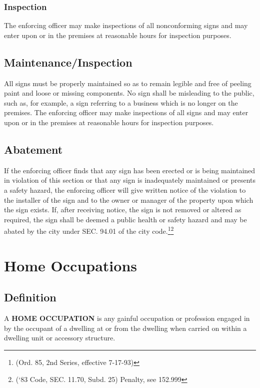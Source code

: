 \subsubsection{Inspection}
The enforcing officer may make inspections of all nonconforming signs and may enter upon or in the premises at reasonable hours for inspection purposes.
\subsection{Maintenance/Inspection}
All signs must be properly maintained so as to remain legible and free of peeling paint and loose or missing components. No sign shall be misleading to the public, such as, for example, a sign referring to a business which is no longer on the premises. The enforcing officer may make inspections of all signs and may enter upon or in the premises at reasonable hours for inspection purposes.
\subsection{Abatement}
If the enforcing officer finds that any sign has been erected or is being maintained in violation of this section or that any sign is inadequately maintained or presents a safety hazard, the enforcing officer will give written notice of the violation to the installer of the sign and to the owner or manager of the property upon which the sign exists. If, after receiving notice, the sign is not removed or altered as required, the sign shall be deemed a public health or safety hazard and may be abated by the city under SEC. 94.01 of the city code.\footnote{(Ord. 85, 2nd Series, effective 7-17-93)}\footnote{(‘83 Code, SEC. 11.70, Subd. 25)  Penalty, see 152.999}

\section{Home Occupations}
\subsection{Definition} A \textbf{HOME OCCUPATION} is any gainful occupation or profession engaged in by the occupant of a dwelling at or from the dwelling when carried on within a dwelling unit or accessory structure.
